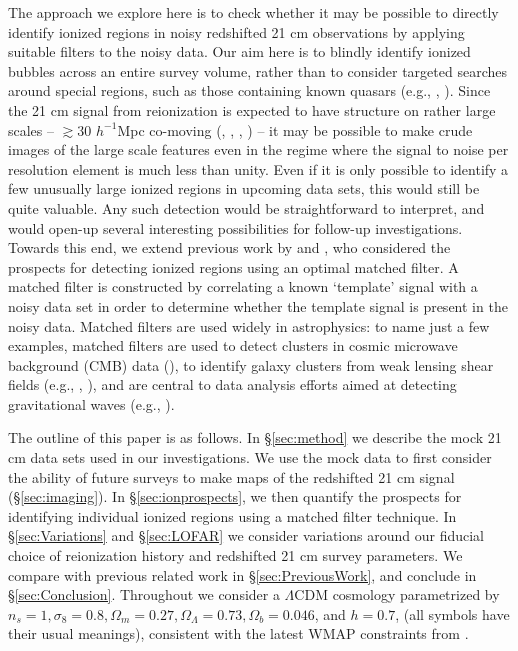 The approach we explore here is to check whether it may be possible to directly identify ionized regions in
noisy redshifted 21 cm observations by applying suitable filters to the noisy data. Our aim here is to blindly identify ionized bubbles across an entire survey volume, rather than to consider targeted searches around special
regions, such as those containing known quasars (e.g., \citealt{Wyithe:2004ta}, \citealt{Friedrich:2012fy}).
Since the 21 cm signal from reionization is
expected to have structure on rather large scales -- $\gtrsim 30$ $h^{-1}$Mpc co-moving (\citealt{Furlanetto:2004nh}, \citealt{Iliev:2005sz}, \citealt{Zahn:2006sg}, \citealt{McQuinn:2006et}) -- it may be possible to make
crude images of the large scale features even in the regime where the signal to noise per resolution element is much less
than unity.  Even if it is only possible to identify a few unusually large ionized regions in upcoming data sets, this would
still be quite valuable. Any such detection would be straightforward to interpret, and would open-up several interesting
possibilities for follow-up investigations.
Towards this end, we extend previous work by \cite{Datta:2007nj} and \cite{Datta:2008ry}, who considered the prospects for detecting
ionized regions using an optimal matched filter. A matched filter is constructed by correlating a known `template' signal with a
noisy data set in order to determine whether the template signal is present in the noisy data. Matched filters are used
widely in astrophysics: to name just a few examples, matched filters are used to detect clusters in cosmic microwave background (CMB) data (\citealt{Haehnelt:1995dg}), to identify galaxy clusters from weak lensing shear fields (e.g., \citealt{Hennawi:2004ai}, \citealt{Marian:2008fd}), 
and are central to data analysis efforts aimed at detecting gravitational waves (e.g., \citealt{Owen:1998dk}).

The outline of this paper is as follows. In \S\ref{sec:method} we describe the mock 21 cm data sets used in our investigations.
We use the mock data to first consider the ability of future surveys
to make maps of the redshifted 21 cm signal (\S\ref{sec:imaging}). In \S\ref{sec:ionprospects}, 
we then quantify the prospects for identifying individual ionized regions using
a matched filter technique. In \S\ref{sec:Variations} and \S\ref{sec:LOFAR} we
consider variations around our fiducial choice of reionization history and redshifted
21 cm survey parameters. We compare with previous related work in \S\ref{sec:PreviousWork},
and conclude in \S \ref{sec:Conclusion}.
Throughout we consider a $\Lambda$CDM cosmology
parametrized by $n_s =1, \sigma_8 = 0.8, \Omega_m = 0.27,
\Omega_\Lambda = 0.73, \Omega_b = 0.046$, and $h=0.7$, (all symbols
have their usual meanings), consistent with the latest WMAP
constraints from \cite{Komatsu:2010fb}.


